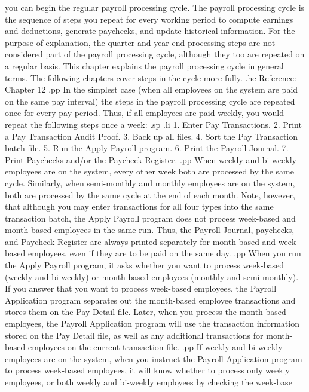 you can begin the regular payroll
processing cycle. The payroll processing cycle is the sequence of
steps you repeat for every working period to compute earnings and deductions,
generate paychecks, and
update historical information.	For the purpose of explanation,
the quarter and year end processing steps are not considered part
of the payroll processing cycle, although they too are repeated
on a regular basis.  This chapter explains the payroll processing
cycle in general terms.  The following chapters cover steps in the cycle more
fully.
.he Reference: Chapter 12
.pp
In the simplest case (when all employees on the system are paid
on the same pay interval) the steps in the payroll processing cycle
are repeated once for every pay period.  Thus, if all employees are paid
weekly, you would repeat the following steps once a week:
.sp
.li
	     1. Enter Pay Transactions.
	     2. Print a Pay Transaction Audit Proof.
	     3. Back up all files.
	     4. Sort the Pay Transaction batch file.
	     5. Run the Apply Payroll program.
	     6. Print the Payroll Journal.
	     7. Print Paychecks and/or the Paycheck Register.
.pp
When weekly and bi-weekly employees are on the system, every other week
both are processed
by the same cycle.  Similarly, when semi-monthly and
monthly employees are on the system, both are processed by
the same cycle at the end of each month.  Note, however, that
although you may enter transactions for all four types into the same
transaction batch, the Apply Payroll program does not process
week-based and month-based employees in the same run.  Thus, the
Payroll Journal, paychecks, and Paycheck Register are always printed
separately for month-based and week-based employees, even if
they are to be paid on the same day.
.pp
When you run the Apply Payroll program, it asks whether
you want to process week-based (weekly and bi-weekly)
or month-based employees (monthly and semi-monthly).  If you
answer that you want to process week-based
employees, the Payroll Application program separates out the
month-based employee transactions and
stores them on the Pay Detail file.  Later, when you process
the month-based employees, the Payroll Application program will use
the transaction information stored on the Pay Detail file, as well
as any additional transactions for month-based employees on the current
transaction file.
.pp
If weekly and bi-weekly employees are on the system, when you instruct
the Payroll Application program to process week-based employees, it
will know whether to process only weekly employees, or both
weekly and bi-weekly employees by checking the week-base
